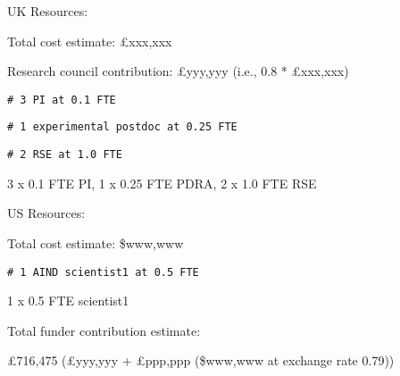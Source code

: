 
UK Resources:

Total cost estimate: £xxx,xxx

Research council contribution: £yyy,yyy (i.e., 0.8 * £xxx,xxx)

\texttt{\# 3 PI at 0.1 FTE}

\texttt{\# 1 experimental postdoc at 0.25 FTE}

\texttt{\# 2 RSE at 1.0 FTE}

3 x 0.1 FTE PI, 1 x 0.25 FTE PDRA, 2 x 1.0 FTE RSE

\vspace{0.1in}
US Resources:

Total cost estimate: \$www,www

\texttt{\# 1 AIND scientist1 at 0.5 FTE}

1 x 0.5 FTE scientist1

\vspace{0.1in}
Total funder contribution estimate:

£716,475 (£yyy,yyy + £ppp,ppp (\$www,www at exchange rate 0.79))


